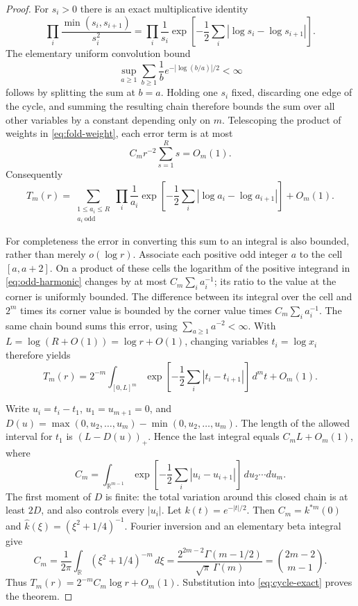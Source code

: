 \begin{proof}
For $s_i>0$ there is an exact multiplicative identity
\begin{equation}\label{eq:min-kernel}
 \prod_i\frac{\min(s_i,s_{i+1})}{s_i^2}
 =\prod_i\frac1{s_i}
 \exp\left[-\frac12\sum_i|\log s_i-\log s_{i+1}|\right].
\end{equation}
The elementary uniform convolution bound
\[
 \sup_{a\geq1}\sum_{b\geq1}\frac1b
    e^{-|\log(b/a)|/2}<\infty
\]
follows by splitting the sum at $b=a$. Holding one $s_i$ fixed,
discarding one edge of the cycle, and summing the resulting chain
therefore bounds the sum over all other variables by a constant
depending only on $m$. Telescoping the product of weights in
\eqref{eq:fold-weight}, each error term is at most
\[
 C_m r^{-2}\sum_{s=1}^R s=O_m(1).
\]
Consequently
\begin{equation}\label{eq:odd-harmonic}
 T_m(r)=\sum_{\substack{1\leq a_i\leq R\\a_i\ \mathrm{odd}}}
 \prod_i\frac1{a_i}
 \exp\left[-\frac12\sum_i|\log a_i-\log a_{i+1}|\right]+O_m(1).
\end{equation}

For completeness the error in converting this sum to an integral is
also bounded, rather than merely $o(\log r)$. Associate each positive
odd integer $a$ to the cell $[a,a+2]$. On a product of these cells the
logarithm of the positive integrand in \eqref{eq:odd-harmonic} changes
by at most $C_m\sum_i a_i^{-1}$; its ratio to the value at the corner
is uniformly bounded. The difference between its integral over the
cell and $2^m$ times its corner value is bounded by the corner value
times $C_m\sum_i a_i^{-1}$. The same chain bound sums this error,
using $\sum_{a\geq1}a^{-2}<\infty$. With
$L=\log(R+O(1))=\log r+O(1)$, changing variables $t_i=\log x_i$
therefore yields
\[
 T_m(r)=2^{-m}\int_{[0,L]^m}
      \exp\left[-\frac12\sum_i|t_i-t_{i+1}|\right]\,d^m t+O_m(1).
\]

Write $u_i=t_i-t_1$, $u_1=u_{m+1}=0$, and
$D(u)=\max(0,u_2,\ldots,u_m)-\min(0,u_2,\ldots,u_m)$.
The length of the allowed interval for $t_1$ is $(L-D(u))_+$.
Hence the last integral equals $C_mL+O_m(1)$, where
\[
 C_m=\int_{\mathbb R^{m-1}}
  \exp\left[-\frac12\sum_i|u_i-u_{i+1}|\right]\,du_2\cdots du_m.
\]
The first moment of $D$ is finite: the total variation around this
closed chain is at least $2D$, and also controls every $|u_i|$.
Let $k(t)=e^{-|t|/2}$. Then $C_m=k^{*m}(0)$ and
$\widehat{k}(\xi)=(\xi^2+1/4)^{-1}$. Fourier inversion and an elementary
beta integral give
\[
 C_m=\frac1{2\pi}\int_{\mathbb R}(\xi^2+1/4)^{-m}\,d\xi
 =\frac{2^{2m-2}\Gamma(m-1/2)}{\sqrt\pi\,\Gamma(m)}
 =\binom{2m-2}{m-1}.
\]
Thus $T_m(r)=2^{-m}C_m\log r+O_m(1)$. Substitution into
\eqref{eq:cycle-exact} proves the theorem.
\end{proof}

